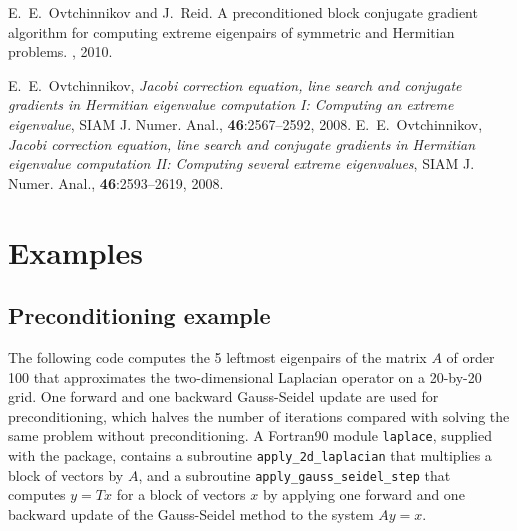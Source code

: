 \documentclass{spral}
\begin{document}

E.~E.~Ovtchinnikov and J.~Reid.
A preconditioned block conjugate gradient
algorithm for computing extreme eigenpairs
of symmetric and Hermitian problems.
\report, 2010.

E.~E.~Ovtchinnikov,
{\em Jacobi correction equation, line search and
conjugate gradients in Hermitian eigenvalue computation I:
Computing an extreme eigenvalue},
SIAM J. Numer. Anal., {\bf 46}:2567--2592, 2008.
E.~E.~Ovtchinnikov,
{\em Jacobi correction equation, line search and
conjugate gradients in Hermitian eigenvalue computation II:
Computing several extreme eigenvalues},
SIAM J. Numer. Anal., {\bf 46}:2593--2619, 2008.


\section{Examples}

\subsection{Preconditioning example}
\label{sec:ex.prec}

The following code 
computes the 5 leftmost eigenpairs of 
the matrix $A$ of order 100 that approximates 
the two-dimensional Laplacian operator
on a 20-by-20 grid.
One forward and one backward Gauss-Seidel update
are used for preconditioning,
which halves the number of iterations
compared with solving the same problem without preconditioning.
A Fortran90 module {\tt laplace}, supplied with the package,
contains a subroutine {\tt apply\_2d\_laplacian}
that multiplies a block of vectors by $A$,
and a subroutine 
{\tt apply\_gauss\_seidel\_step}
that computes $y = T x$ for a block of vectors $x$
by applying one forward and one backward update
of the Gauss-Seidel method to the system $A y = x$.
\end{document}
